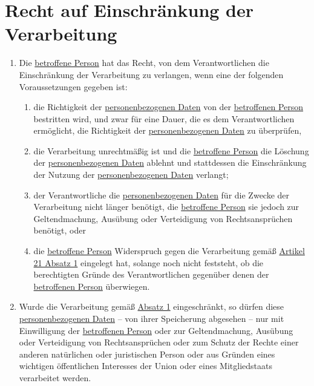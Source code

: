 \chapter{Recht auf Einschränkung der Verarbeitung}
\label{ch:18}


\begin{enumerate}

  \item Die \hyperref[itm:04-1]{betroffene Person} hat das Recht, von dem Verantwortlichen die Einschränkung der Verarbeitung zu verlangen,
   wenn eine der folgenden Voraussetzungen gegeben ist:
  \label{itm:18-1}

  \begin{enumerate}
  
    \item die Richtigkeit der \hyperref[itm:04-1]{personenbezogenen Daten} von der \hyperref[itm:04-1]{betroffenen Person} bestritten wird, und zwar für eine
     Dauer, die es dem Verantwortlichen ermöglicht, die Richtigkeit der \hyperref[itm:04-1]{personenbezogenen Daten} zu überprüfen,
    \label{itm:18-1a}

    \item die Verarbeitung unrechtmäßig ist und die \hyperref[itm:04-1]{betroffene Person} die Löschung der \hyperref[itm:04-1]{personenbezogenen Daten} ablehnt
     und stattdessen die Einschränkung der Nutzung der \hyperref[itm:04-1]{personenbezogenen Daten} verlangt;
    \label{itm:18-1b}

    \item der Verantwortliche die \hyperref[itm:04-1]{personenbezogenen Daten} für die Zwecke der Verarbeitung nicht länger benötigt, die
     \hyperref[itm:04-1]{betroffene Person} sie jedoch zur Geltendmachung, Ausübung oder Verteidigung von Rechtsansprüchen benötigt, oder
    \label{itm:18-1c}

    \item die \hyperref[itm:04-1]{betroffene Person} Widerspruch gegen die Verarbeitung gemäß \hyperref[itm:21-1]{Artikel 21 Absatz 1}
     eingelegt hat, solange noch nicht feststeht, ob die berechtigten Gründe des Verantwortlichen gegenüber denen der
     \hyperref[itm:04-1]{betroffenen Person} überwiegen.
    \label{itm:18-1d}

  \end{enumerate}

  \item Wurde die Verarbeitung gemäß \hyperref[itm:18-1]{Absatz 1} eingeschränkt, so dürfen diese \hyperref[itm:04-1]{personenbezogenen Daten}
   -- von ihrer Speicherung abgesehen -- nur mit Einwilligung der \hyperref[itm:04-1]{betroffenen Person} oder zur Geltendmachung, Ausübung
   oder Verteidigung von Rechtsansprüchen oder zum Schutz der Rechte einer anderen natürlichen oder juristischen
   Person oder aus Gründen eines wichtigen öffentlichen Interesses der Union oder eines Mitgliedstaats verarbeitet
   werden.
  \label{itm:18-2}


\end{enumerate}
